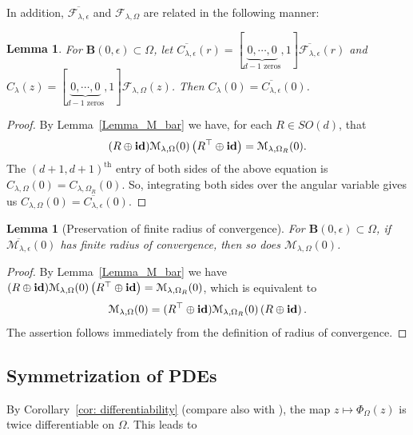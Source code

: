 \documentclass[11pt,a4paper,english,reqno]{amsart}
\theoremstyle{plain}
\newtheorem{lemma}[definition]{Lemma}
\newcommand{\e}{\epsilon}
\newcommand{\1}{\mathbbm{1}}
\newcommand{\B}{\mathbf{B}}
\begin{document}
In addition, $\overline{\mathcal{F}_{\lambda,\e}}$ and $\mathcal{F}_{\lambda, \Omega}$ are related in the following manner:
\begin{lemma}
For $\B(0, \e) \subset \Omega$, let $\overline{C_{\lambda, \e}}(r) = [\underbrace{0,\cdots, 0}_{d-1\text{ zeros}}, 1]  \overline{\mathcal{F}_{\lambda,\e}}(r)$ and $C_{\lambda}(z) = [\underbrace{0,\cdots, 0}_{d-1\text{ zeros}}, 1] \mathcal{F}_{\lambda,\Omega}(z)$. Then $
C_{\lambda}(0) = \overline{C_{\lambda, \e}}(0)$.
\end{lemma}
\begin{proof}
By Lemma~\ref{Lemma_M_bar} we have, for each $R \in SO(d)$, that
\begin{eqnarray*}
(R \oplus {\bf id})  \mathcal{M}_{\lambda,\Omega}(0) \left(R^{\top} \oplus {\bf id}\right) = \mathcal{M}_{\lambda,\Omega_R}(0).\end{eqnarray*}
The $(d+1, d+1)^{\text{th}}$ entry of both sides of the above equation is $
 C_{\lambda,\Omega}(0) =  C_{\lambda,\Omega_R}(0)$. So, integrating both sides over the angular variable gives us $C_{\lambda,\Omega}(0) =  \overline{C_{\lambda,\e}}(0).$  \end{proof}

\begin{lemma}[Preservation of finite radius of convergence]\label{lemma_FRC}
For $\B(0, \e) \subset \Omega$, if  $\overline{\mathcal{M}_{\lambda, \e}}(0)$ has finite radius of convergence, then so does $\mathcal{M}_{\lambda, \Omega}(0)$.
\end{lemma}


\begin{proof}
By Lemma~\ref{Lemma_M_bar} we have $(R \oplus {\bf id})  \mathcal{M}_{\lambda,\Omega}(0) \left(R^{\top} \oplus {\bf id}\right) = \mathcal{M}_{\lambda,\Omega_R}(0)$, which is equivalent to
\begin{eqnarray*}
 \mathcal{M}_{\lambda,\Omega}(0)  = (R^{\top} \oplus {\bf id})  \mathcal{M}_{\lambda,\Omega_{R}}(0)\left(R \oplus {\bf id}\right).
\end{eqnarray*}
The assertion follows immediately from the definition of radius of convergence. \end{proof}



\subsection{Symmetrization of PDEs}\label{subsec:key}
By Corollary~\ref{cor: differentiability} (compare also with \cite{ni2012expected}),  the map $z \mapsto \Phi_{\Omega}(z)$ is twice differentiable on  $\Omega$. This leads to
\end{document}
